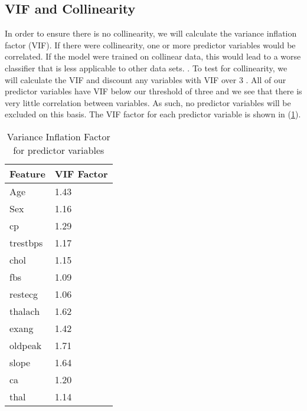 \documentclass[letter]{article}
\begin{document}
\subsection{VIF and Collinearity}
In order to ensure there is no collinearity, we will calculate the variance inflation factor (VIF). If there were collinearity, 
one or more predictor variables would be correlated.  If the model were trained on collinear data, this would lead to a worse 
classifier that is less applicable to other data sets.  \citep{collinearity}.  To test for collinearity, we will calculate the 
VIF and discount any variables with VIF over \(3\) \citep{psu_vif}.  All of our predictor variables have VIF below our threshold 
of three and we see that there is very little correlation between variables.  As such, no predictor variables will be excluded on 
this basis.  The VIF factor for each predictor variable is shown in (\ref{tab:VIF_fac}).
\begin{table}[]
	\centering
	\begin{tabular}{@{}ll@{}}
		\toprule
		Feature  & VIF Factor \\ \midrule
		Age      & 1.43       \\
		Sex      & 1.16       \\
		cp       & 1.29       \\
		trestbps & 1.17       \\
		chol     & 1.15       \\
		fbs      & 1.09       \\
		restecg  & 1.06       \\
		thalach  & 1.62       \\
		exang    & 1.42       \\
		oldpeak  & 1.71       \\
		slope    & 1.64       \\
		ca       & 1.20       \\
		thal     & 1.14       \\ \bottomrule
	\end{tabular}
	\caption{Variance Inflation Factor for predictor variables}
	\label{tab:VIF_fac}
\end{table}
\end{document}
